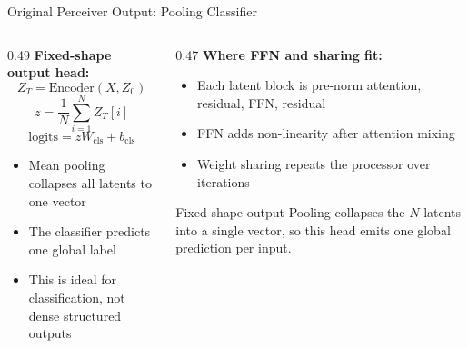 \documentclass[aspectratio=169,11pt]{beamer}
\begin{document}
\begin{frame}[shrink=5]{Original Perceiver Output: Pooling Classifier}
  \begin{columns}[T]
    \begin{column}{0.49\textwidth}
      \textbf{Fixed-shape output head:}
      \[
        Z_T=\mathrm{Encoder}(X,Z_0)
      \]
      \[
        z=\frac{1}{N}\sum_{i=1}^{N}Z_T[i]
      \]
      \[
        \mathrm{logits}=zW_{\mathrm{cls}}+b_{\mathrm{cls}}
      \]

      \vspace{0.4em}
      \begin{itemize}
        \item Mean pooling collapses all latents to one vector
        \item The classifier predicts one global label
        \item This is ideal for classification, not dense structured outputs
      \end{itemize}
    \end{column}
    \begin{column}{0.47\textwidth}
      \small
      \textbf{Where FFN and sharing fit:}
      \begin{itemize}
        \item Each latent block is pre-norm attention, residual, FFN, residual
        \item FFN adds non-linearity after attention mixing
        \item Weight sharing repeats the processor over iterations
      \end{itemize}

      \vspace{0.35em}
      \begin{block}{Fixed-shape output}
        Pooling collapses the $N$ latents into a single vector, so this head emits one global prediction per input.
      \end{block}
    \end{column}
  \end{columns}
\end{frame}
\end{document}
